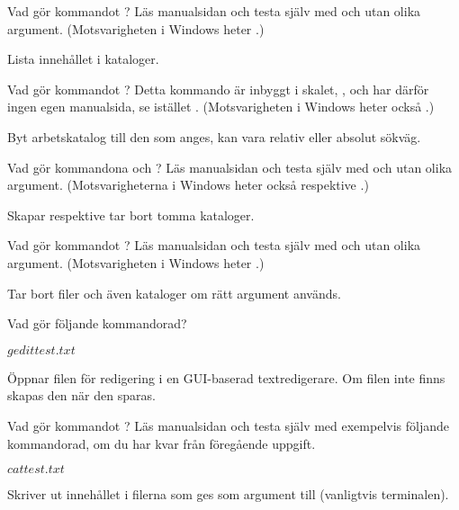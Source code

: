 \documentclass[a4paper]{miunasgn}
\begin{document}
\begin{questions}
  \question\label{q:ls}
  Vad gör kommandot ?
  Läs manualsidan och testa själv med och utan olika argument.
  (Motsvarigheten i Windows heter .)
  \begin{solution}
    Lista innehållet i kataloger.
  \end{solution}

  \question\label{q:cd}
  Vad gör kommandot ?
  Detta kommando är inbyggt i skalet, , och har därför ingen egen 
  manualsida, se istället .
  (Motsvarigheten i Windows heter också .)
  \begin{solution}
    Byt arbetskatalog till den som anges, kan vara relativ eller absolut 
    sökväg.
  \end{solution}

  \question\label{q:mkdir}
  Vad gör kommandona  och ?
  Läs manualsidan och testa själv med och utan olika argument.
  (Motsvarigheterna i Windows heter också  respektive 
  .)
  \begin{solution}
    Skapar respektive tar bort tomma kataloger.
  \end{solution}

  \question\label{q:rm}
  Vad gör kommandot ?
  Läs manualsidan och testa själv med och utan olika argument.
  (Motsvarigheten i Windows heter .)
  \begin{solution}
    Tar bort filer och även kataloger om rätt argument används.
  \end{solution}

  \question\label{q:gedit}
  Vad gör följande kommandorad?
  \begin{terminal}
$ gedit test.txt
$
  \end{terminal}
  \begin{solution}
    Öppnar filen  för redigering i en GUI-baserad 
    textredigerare.
    Om filen inte finns skapas den när den sparas.
  \end{solution}

  \question\label{q:cat}
  Vad gör kommandot ?
  Läs manualsidan och testa själv med exempelvis följande kommandorad, om du 
  har kvar  från föregående uppgift.
  \begin{terminal}
$ cat test.txt
$
  \end{terminal}
  \begin{solution}
    Skriver ut innehållet i filerna som ges som argument till  
    (vanligtvis terminalen).
  \end{solution}


\end{questions}
\end{document}
